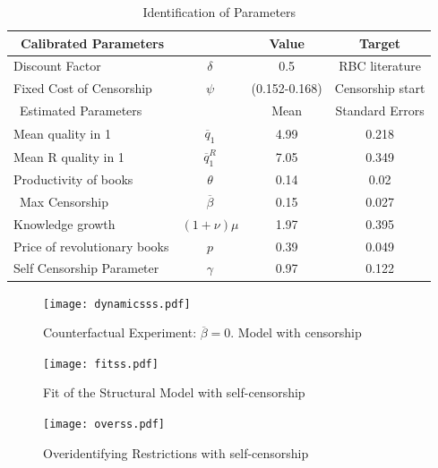 \documentclass[12pt]{article}
\begin{document}
\begin{table}[htpb]
    \caption{Identification of Parameters}
    \centering %
    \begin{tabular}{@{} l c c c @{}}
    \hline%
     \ Calibrated Parameters &  & Value & Target  \\ [0.05ex] %
     \hline
     Discount Factor  & $\delta$   &0.5&   RBC literature\\[0.15ex]
     Fixed Cost of Censorship  & $\psi$   &(0.152-0.168)& Censorship start \\[0.15ex]
     \hline %
    \ Estimated Parameters &  & Mean & Standard Errors  \\ [0.05ex] %
    \hline %
    \rule{0pt}{2.5ex}
    Mean quality in 1  & $\overline{q}_1$   & 4.99 & 0.218  \\[0.15ex]
    Mean R quality in 1  & $\overline{q}^R_1$   & 7.05 & 0.349  \\[0.15ex]
     Productivity of books  & $\theta$   & 0.14 &  0.02  \\[0.15ex]
    \ Max Censorship  & $\overline{\beta}$   & 0.15 &  0.027   \\[0.15ex]
    Knowledge growth & $(1+\nu)\mu$   & 1.97 &  0.395   \\[0.15ex]
    Price of revolutionary books   & $p$   & 0.39 &  0.049  \\[0.15ex]
     Self Censorship Parameter   & $\gamma$   & 0.97 &  0.122  \\[0.15ex]
    \hline
    \end{tabular}
    \label{table:paramss}
    \end{table}

\begin{figure}[htbp]
\texttt{[image: dynamicsss.pdf]}
\caption{Counterfactual Experiment: $\overline{\beta}=0$. Model with censorship}
\label{fig:exps}
\end{figure}

\begin{figure}[htpb]
\centering
\texttt{[image: fitss.pdf]}
\caption{Fit of the Structural Model with self-censorship}
\label{fig:fits}
\end{figure}


\begin{figure}[htbp]
\centering
\texttt{[image: overss.pdf]}
\caption{Overidentifying Restrictions with self-censorship}
\label{fig:overs}
\end{figure}

\FloatBarrier
\end{document}
